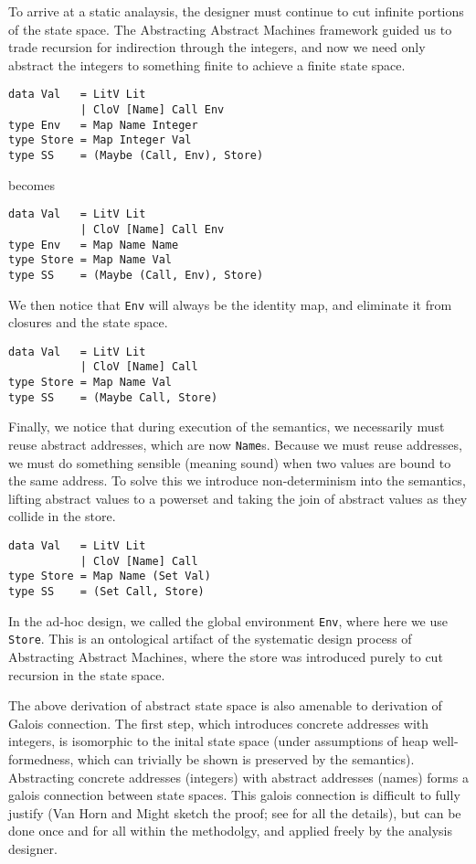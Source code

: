 To arrive at a static analaysis, the designer must continue to cut infinite
portions of the state space.
%
The Abstracting Abstract Machines framework guided us to trade recursion for
indirection through the integers, and now we need only abstract the integers to
something finite to achieve a finite state space.
%
\begin{lstlisting}
data Val   = LitV Lit
           | CloV [Name] Call Env
type Env   = Map Name Integer
type Store = Map Integer Val
type SS    = (Maybe (Call, Env), Store)
\end{lstlisting}
%
becomes
%
\begin{lstlisting}
data Val   = LitV Lit
           | CloV [Name] Call Env
type Env   = Map Name Name
type Store = Map Name Val
type SS    = (Maybe (Call, Env), Store)
\end{lstlisting}
%
We then notice that \lstinline|Env| will always be the identity map, and
eliminate it from closures and the state space.
%
\begin{lstlisting}
data Val   = LitV Lit
           | CloV [Name] Call
type Store = Map Name Val
type SS    = (Maybe Call, Store)
\end{lstlisting}
%
Finally, we notice that during execution of the semantics, we necessarily must
reuse abstract addresses, which are now \lstinline|Name|s.
%
Because we must reuse addresses, we must do something sensible (meaning sound)
when two values are bound to the same address.
%
To solve this we introduce non-determinism into the semantics, lifting abstract
values to a powerset and taking the join of abstract values as they collide in
the store.
%
\begin{lstlisting}
data Val   = LitV Lit
           | CloV [Name] Call
type Store = Map Name (Set Val)
type SS    = (Set Call, Store)
\end{lstlisting}


In the ad-hoc design, we called the global environment \lstinline|Env|, where
here we use \lstinline|Store|.
%
This is an ontological artifact of the systematic design process of Abstracting
Abstract Machines, where the store was introduced purely to cut recursion in
the state space.


The above derivation of abstract state space is also amenable to derivation of
Galois connection.
%
The first step, which introduces concrete addresses with integers, is
isomorphic to the inital state space (under assumptions of heap
well-formedness, which can trivially be shown is preserved by the semantics).
%
Abstracting concrete addresses (integers) with abstract addresses (names) forms
a galois connection between state spaces.
%
This galois connection is difficult to fully justify (Van Horn and Might sketch
the proof; see \cite{midtgaard:2008:calculational-cfa} for all the details),
but can be done once and for all within the methodolgy, and applied freely by
the analysis designer.

